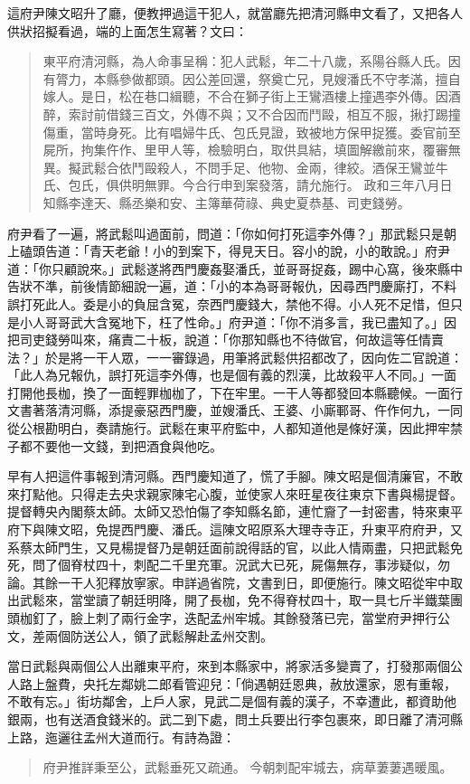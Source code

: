 這府尹陳文昭升了廳，便教押過這干犯人，就當廳先把清河縣申文看了，又把各人供狀招擬看過，端的上面怎生寫著？文曰：
\begin{quote}
東平府清河縣，為人命事呈稱：犯人武鬆，年二十八歲，系陽谷縣人氏。因有膂力，本縣參做都頭。因公差回還，祭奠亡兄，見嫂潘氏不守孝滿，擅自嫁人。是日，松在巷口緝聽，不合在獅子街上王鸞酒樓上撞遇李外傳。因酒醉，索討前借錢三百文，外傳不與；又不合因而鬥毆，相互不服，揪打踢撞傷重，當時身死。比有唱婦牛氏、包氏見證，致被地方保甲捉獲。委官前至屍所，拘集仵作、里甲人等，檢驗明白，取供具結，填圖解繳前來，覆審無異。擬武鬆合依鬥毆殺人，不問手足、他物、金兩，律絞。酒保王鸞並牛氏、包氏，俱供明無罪。今合行申到案發落，請允施行。
政和三年八月日知縣李達天、縣丞樂和安、主簿華荷祿、典史夏恭基、司吏錢勞。
\end{quote}

府尹看了一遍，將武鬆叫過面前，問道：「你如何打死這李外傳？」那武鬆只是朝上磕頭告道：「青天老爺！小的到案下，得見天日。容小的說，小的敢說。」府尹道：「你只顧說來。」武鬆遂將西門慶姦娶潘氏，並哥哥捉姦，踢中心窩，後來縣中告狀不準，前後情節細說一遍，道：「小的本為哥哥報仇，因尋西門慶廝打，不料誤打死此人。委是小的負屈含冤，奈西門慶錢大，禁他不得。小人死不足惜，但只是小人哥哥武大含冤地下，枉了性命。」府尹道：「你不消多言，我已盡知了。」因把司吏錢勞叫來，痛責二十板，說道：「你那知縣也不待做官，何故這等任情賣法？」於是將一干人眾，一一審錄過，用筆將武鬆供招都改了，因向佐二官說道：「此人為兄報仇，誤打死這李外傳，也是個有義的烈漢，比故殺平人不同。」一面打開他長枷，換了一面輕罪枷枷了，下在牢里。一干人等都發回本縣聽候。一面行文書著落清河縣，添提豪惡西門慶，並嫂潘氏、王婆、小廝鄆哥、仵作何九，一同從公根勘明白，奏請施行。武鬆在東平府監中，人都知道他是條好漢，因此押牢禁子都不要他一文錢，到把酒食與他吃。

早有人把這件事報到清河縣。西門慶知道了，慌了手腳。陳文昭是個清廉官，不敢來打點他。只得走去央求親家陳宅心腹，並使家人來旺星夜往東京下書與楊提督。提督轉央內閣蔡太師。太師又恐怕傷了李知縣名節，連忙齎了一封密書，特來東平府下與陳文昭，免提西門慶、潘氏。這陳文昭原系大理寺寺正，升東平府府尹，又系蔡太師門生，又見楊提督乃是朝廷面前說得話的官，以此人情兩盡，只把武鬆免死，問了個脊杖四十，刺配二千里充軍。況武大已死，屍傷無存，事涉疑似，勿論。其餘一干人犯釋放寧家。申詳過省院，文書到日，即便施行。陳文昭從牢中取出武鬆來，當堂讀了朝廷明降，開了長枷，免不得脊杖四十，取一具七斤半鐵葉團頭枷釘了，臉上刺了兩行金字，迭配孟州牢城。其餘發落已完，當堂府尹押行公文，差兩個防送公人，領了武鬆解赴孟州交割。

當日武鬆與兩個公人出離東平府，來到本縣家中，將家活多變賣了，打發那兩個公人路上盤費，央托左鄰姚二郎看管迎兒：「倘遇朝廷恩典，赦放還家，恩有重報，不敢有忘。」街坊鄰舍，上戶人家，見武二是個有義的漢子，不幸遭此，都資助他銀兩，也有送酒食錢米的。武二到下處，問土兵要出行李包裹來，即日離了清河縣上路，迤邐往孟州大道而行。有詩為證：
\begin{quote}
府尹推詳秉至公，武鬆垂死又疏通。
今朝刺配牢城去，病草萋萋遇暖風。
\end{quote}

